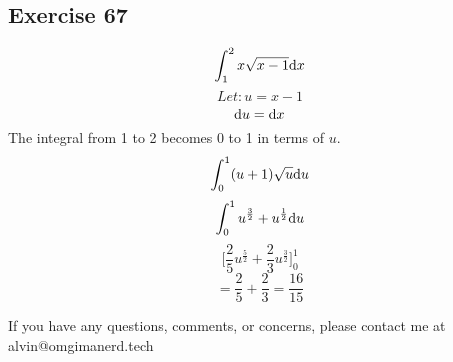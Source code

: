 \documentclass[letterpaper, 12pt]{math}
\begin{document}
\subsection*{Exercise 67}
\[ \int_{1}^{2} x \sqrt{x - 1} \mathrm{d}{x} \]
\[ Let: u = x - 1 \]
\[ \mathrm{d}{u} = \mathrm{d}{x} \]
The integral from 1 to 2 becomes 0 to 1 in terms of \( u \).
\[ \int_{0}^{1} (u + 1)\sqrt{u} \mathrm{d}{u} \]
\[ \int_{0}^{1} u^\frac{3}{2} + u^\frac{1}{2} \mathrm{d}{u} \]
\[ \bigg[ \frac{2}{5}u^{\frac{5}{2}} + \frac{2}{3}u^{\frac{3}{2}} \bigg]_0^1 \]
\[ = \frac{2}{5} + \frac{2}{3} = \frac{16}{15} \]

\begin{center}
  If you have any questions, comments, or concerns, please contact me at
  alvin@omgimanerd.tech
\end{center}
\end{document}
